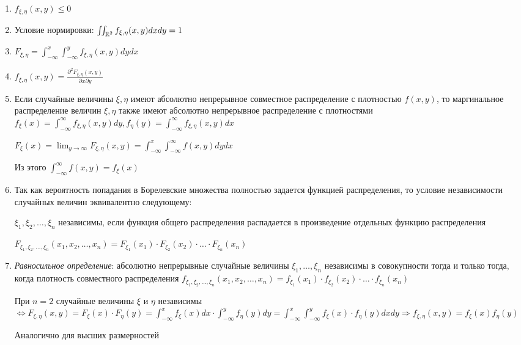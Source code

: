\documentclass[12pt]{article}
\begin{document}
    \begin{enumerate}
        \item $f_{\xi, \eta}(x, y) \leq 0$
        \item Условие нормировки: $\iint_{\mathbb{R}^2} f_{\xi, \eta}(x, y) dxdy = 1$
        \item $F_{\xi, \eta} = \int_{-\infty}^x \int_{-\infty}^y f_{\xi, \eta}(x, y) dydx$

        \item $f_{\xi, \eta}(x, y) = \frac{\partial^2 F_{\xi, \eta}(x, y)}{\partial x \partial y}$
        
        \item Если случайные величины $\xi, \eta$ имеют абсолютно непрерывное совместное распределение с плотностью $f(x, y)$, 
        то маргинальное распределение величин $\xi, \eta$ также имеют абсолютно непрерывное распределение
        с плотностями $f_\xi(x) = \int_{-\infty}^\infty f_{\xi, \eta}(x, y) dy, f_\eta(y) = \int_{-\infty}^\infty f_{\xi, \eta}(x, y) dx$

        \begin{MyProof}
            $F_{\xi}(x) = \lim_{y \to \infty} F_{\xi, \eta}(x, y) = \int_{-\infty}^x \int_{-\infty}^\infty f(x, y) dydx$

            Из этого $\int_{-\infty}^\infty f(x, y) = f_\xi(x)$
        \end{MyProof}

        \item Так как вероятность попадания в Борелевские множества полностью задается функцией распределения, 
        то условие независимости случайных величин эквивалентно следующему:

        $\xi_1, \xi_2, \dots, \xi_n$ независимы, если функция общего распределения распадается в произведение 
        отдельных функцию распределения
    
        $F_{\xi_1, \xi_2, \dots, \xi_n}(x_1, x_2, \dots, x_n) = F_{\xi_1}(x_1) \cdot F_{\xi_2}(x_2) \cdot \dots \cdot F_{\xi_n}(x_n)$

        \item \textit{Равносильное определение}: абсолютно непрерывные случайные величины $\xi_1, \dots, \xi_n$ независимы в совокупности тогда и только тогда, 
        когда плотность совместного распределения $f_{\xi_1, \xi_2, \dots, \xi_n}(x_1, x_2, \dots, x_n) = f_{\xi_1}(x_1) \cdot f_{\xi_2}(x_2) \cdot \dots \cdot f_{\xi_n}(x_n)$
    
        \begin{MyProof}
            При $n = 2$ случайные величины $\xi$ и $\eta$ независимы $\Longleftrightarrow F_{\xi, \eta}(x, y) = F_\xi(x) \cdot F_\eta(y) = \int_{-\infty}^x f_\xi(x) dx \cdot \int_{-\infty}^y f_\eta(y) dy = \int_{-\infty}^x \int_{-\infty}^y f_\xi(x) \cdot f_\eta(y) dxdy \Longrightarrow f_{\xi,\eta}(x, y) = f_\xi(x)f_\eta(y)$

            Аналогично для высших размерностей
        \end{MyProof}

    \end{enumerate}
\end{document}
